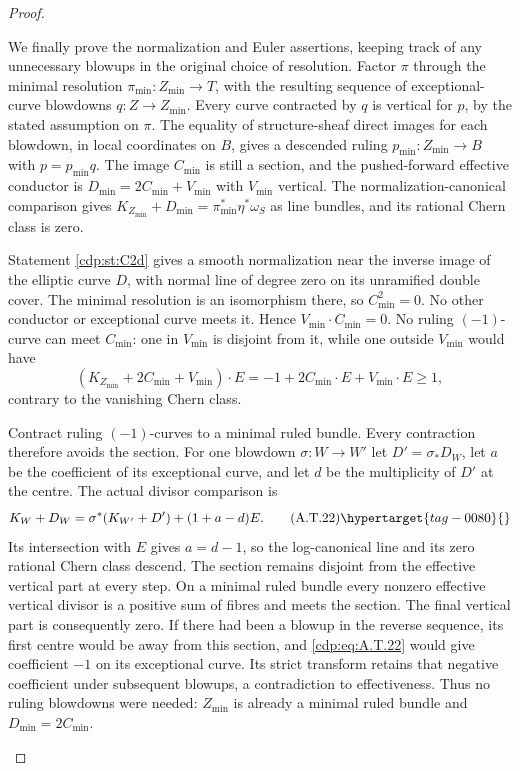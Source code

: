 \begin{proof}
\begin{enumerate}[label={$\langle1\rangle$\arabic*.},leftmargin=*]
We finally prove the normalization and Euler assertions,
keeping track of any unnecessary blowups in the original
choice of resolution. Factor $\pi$ through the minimal
resolution $\pi_{\min}:Z_{\min}\to T$, with the resulting
sequence of exceptional-curve blowdowns
$q:Z\to Z_{\min}$. Every curve contracted by $q$ is
vertical for $p$, by the stated assumption on $\pi$.
The equality of structure-sheaf direct images for each
blowdown, in local coordinates on $B$, gives a descended
ruling $p_{\min}:Z_{\min}\to B$ with
$p=p_{\min}q$. The image $C_{\min}$ is still a section,
and the pushed-forward effective conductor is
$D_{\min}=2C_{\min}+V_{\min}$ with $V_{\min}$ vertical.
The normalization-canonical comparison gives
$K_{Z_{\min}}+D_{\min}=\pi_{\min}^*\eta^*\omega_S$
as line bundles, and its rational Chern class is zero.

Statement \ref{cdp:st:C2d} gives a smooth normalization near the
inverse image of the elliptic curve $D$, with normal
line of degree zero on its unramified double cover.
The minimal resolution is an isomorphism there, so
$C_{\min}^2=0$. No other conductor or exceptional
curve meets it. Hence $V_{\min}\cdot C_{\min}=0$.
No ruling $(-1)$-curve can meet $C_{\min}$: one in
$V_{\min}$ is disjoint from it, while one outside
$V_{\min}$ would have
\[
 (K_{Z_{\min}}+2C_{\min}+V_{\min})\cdot E
       =-1+2C_{\min}\cdot E+V_{\min}\cdot E\ge1,
\]
contrary to the vanishing Chern class.

Contract ruling $(-1)$-curves to a minimal ruled bundle.
Every contraction therefore avoids the section. For
one blowdown $\sigma:W\to W'$ let $D'=\sigma_*D_W$,
let $a$ be the coefficient of its exceptional curve,
and let $d$ be the multiplicity of $D'$ at the centre.
The actual divisor comparison is
\[
 K_W+D_W=\sigma^*(K_{W'}+D')+(1+a-d)E.
                                                        \tag{A.T.22}\hypertarget{tag-0080}{}\label{cdp:eq:A.T.22}
\]
Its intersection with $E$ gives $a=d-1$, so the
log-canonical line and its zero rational Chern class
descend. The section remains disjoint from the
effective vertical part at every step. On a minimal
ruled bundle every nonzero effective vertical divisor
is a positive sum of fibres and meets the section.
The final vertical part is consequently zero. If
there had been a blowup in the reverse sequence,
its first centre would be away from this section,
and \eqref{cdp:eq:A.T.22} would give coefficient $-1$ on its
exceptional curve. Its strict transform retains that
negative coefficient under subsequent blowups, a
contradiction to effectiveness. Thus no ruling
blowdowns were needed: $Z_{\min}$ is already a
minimal ruled bundle and $D_{\min}=2C_{\min}$.


\end{enumerate}
\end{proof}
